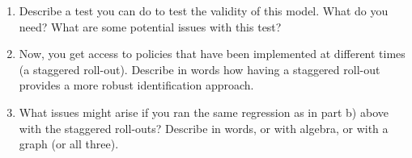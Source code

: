 \documentclass[11pt, a4paper]{article}
\begin{document}
\begin{enumerate}
\begin{enumerate}
    \item Describe a test you can do to test the validity of this
      model. What do you need? What are some potential issues with
      this test?
    \item Now, you get access to policies that have been implemented
      at different times (a staggered roll-out). Describe in words how
      having a staggered roll-out provides a more robust
      identification approach.
    \item What issues might arise if you ran the same regression as in
      part b) above with the staggered roll-outs?  Describe in words,
      or with algebra, or with a graph (or all three). 
    \end{enumerate}
\end{enumerate}
  
\end{document}
